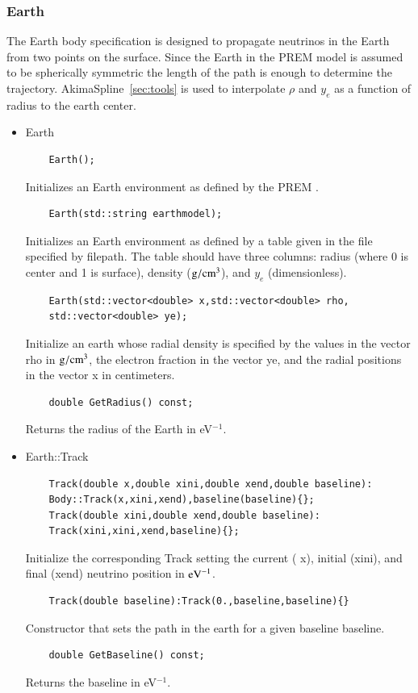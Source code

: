 \documentclass[3p,12pt]{elsarticle}
\newcommand{\ttf}{\ttfamily}
\begin{document}
\subsubsection{Earth \label{sec:earth}}
The {\ttf Earth} body specification is designed to propagate neutrinos
in the Earth from two points on the surface. Since the Earth in the
PREM model is assumed to be spherically symmetric the length of the
path is enough to determine the trajectory. {\ttfamily AkimaSpline}~\ref{sec:tools} is used to interpolate $\rho$ and $y_e$ as a function of radius to the earth center.
\begin{itemize}
\item {\ttf Earth}
  \begin{lstlisting}
    Earth();
  \end{lstlisting}
  Initializes an {\ttf Earth} environment as defined by the PREM \citep{dziewonski1981preliminary}.
  \begin{lstlisting}
    Earth(std::string earthmodel);
  \end{lstlisting}
  Initializes an {\ttf Earth} environment as defined by a table given in the file specified by {\ttf filepath}. The table should have three columns: radius (where 0 is center and 1 is surface), density (${\rm g}/{\rm cm}^3$), and $y_e$ (dimensionless). 
  \begin{lstlisting}
    Earth(std::vector<double> x,std::vector<double> rho,
    std::vector<double> ye);
  \end{lstlisting}
  Initialize an {\ttf earth} whose radial density is specified by the
  values in the vector {\ttf rho} in ${\rm g}/{\rm cm}^3$, the
  electron fraction in the vector {\ttf ye}, and the radial positions
  in the vector {\ttf x} in centimeters. 

  \begin{lstlisting}
    double GetRadius() const;
  \end{lstlisting}
  Returns the radius of the Earth in eV$^{-1}$.

\item {\ttf Earth::Track}
  \begin{lstlisting}
    Track(double x,double xini,double xend,double baseline):
    Body::Track(x,xini,xend),baseline(baseline){};
    Track(double xini,double xend,double baseline):
    Track(xini,xini,xend,baseline){};
  \end{lstlisting}
  Initialize the corresponding {\ttf Track} setting the current ({\ttf
    x}), initial ({\ttf xini}), and final ({\ttf xend}) neutrino position in ${\rm eV}^{-1}$.
  
  \begin{lstlisting}
    Track(double baseline):Track(0.,baseline,baseline){}
  \end{lstlisting}
  Constructor that sets the path in the earth for a given baseline
  {\ttf baseline}.

  \begin{lstlisting}
    double GetBaseline() const;
  \end{lstlisting}
  Returns the baseline in eV$^{-1}$.
    
\end{itemize}
\end{document}
